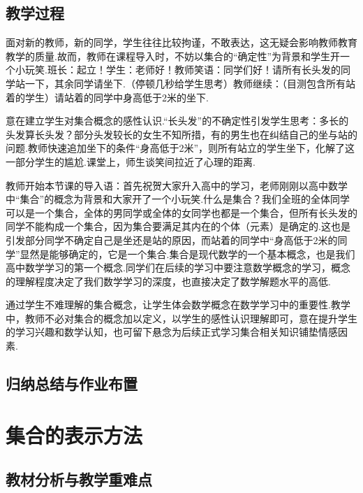 \subsection{教学过程}
\begin{intro}
	面对新的教师，新的同学，学生往往比较拘谨，不敢表达，这无疑会影响教师教育教学的质量.故而，教师在课程导入时，不妨以集合的“确定性”为背景和学生开一个小玩笑.班长：起立！学生：老师好！教师笑语：同学们好！请所有长头发的同学站一下，其余同学请坐下.（停顿几秒给学生思考）教师继续：（目测包含所有站着的学生）请站着的同学中身高低于2米的坐下.
\end{intro}
\begin{purpose}
	意在建立学生对集合概念的感性认识.“长头发”的不确定性引发学生思考：多长的头发算长头发？部分头发较长的女生不知所措，有的男生也在纠结自己的坐与站的问题.教师快速追加坐下的条件“身高低于2米”，则所有站立的学生坐下，化解了这一部分学生的尴尬.课堂上，师生谈笑间拉近了心理的距离.
\end{purpose}

\begin{intro}
	教师开始本节课的导入语：首先祝贺大家升入高中的学习，老师刚刚以高中数学中“集合”的概念为背景和大家开了一个小玩笑.什么是集合？我们全班的全体同学可以是一个集合，全体的男同学或全体的女同学也都是一个集合，但所有长头发的同学不能构成一个集合，因为集合要满足其内在的个体（元素）是确定的.这也是引发部分同学不确定自己是坐还是站的原因，而站着的同学中“身高低于2米的同学”显然是能够确定的，它是一个集合.集合是现代数学的一个基本概念，也是我们高中数学学习的第一个概念.同学们在后续的学习中要注意数学概念的学习，概念的理解程度决定了我们数学学习的深度，也直接决定了数学解题水平的高低.
\end{intro}
\begin{purpose}
	通过学生不难理解的集合概念，让学生体会数学概念在数学学习中的重要性.教学中，教师不必对集合的概念加以定义，以学生的感性认识理解即可，意在提升学生的学习兴趣和数学认知，也可留下悬念为后续正式学习集合相关知识铺垫情感因素.
\end{purpose}

\subsection{归纳总结与作业布置}
\section{集合的表示方法}
\subsection{教材分析与教学重难点}

